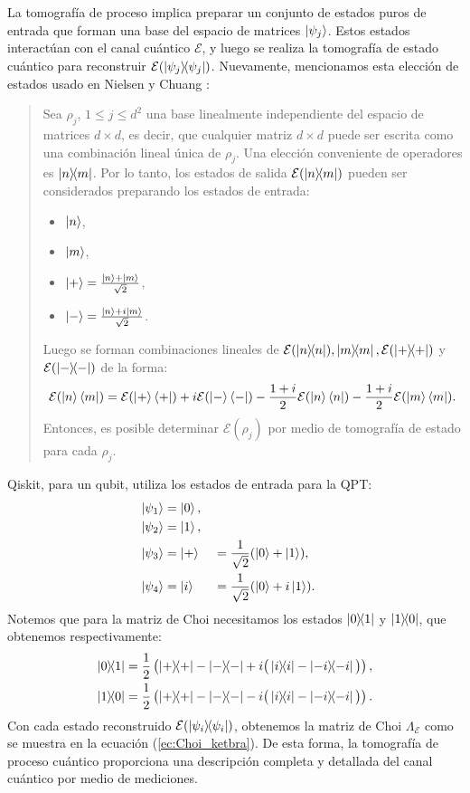 \documentclass[letterpaper,12pt]{thesisECFM}
\theoremstyle{plain}
\theoremstyle{definition}
\theoremstyle{definition}
\theoremstyle{remark}
\newcommand{\1}{\mathbb{1}}
\begin{document}
La tomografía de proceso implica preparar un conjunto de estados puros de entrada que forman una base del espacio de matrices $\ket{\psi_j}$. Estos estados interactúan con el canal cuántico $\mathcal{E}$, y luego se realiza la tomografía de estado cuántico para reconstruir $\mathcal{E}(\ketbra{\psi_j}{\psi_j})$. Nuevamente, mencionamos esta elección de estados usado en Nielsen y Chuang \cite{nielsen_chuang_2011}: 
\begin{quote}
Sea $\rho_j$, $1\leq j \leq d^2$ una base linealmente independiente del espacio de matrices $d\times d$, es decir, que cualquier matriz $d \times d$ puede ser escrita como una combinación lineal única de $\rho_j$.  Una elección conveniente de operadores es $\ketbra{n}{m}$. Por lo tanto, los estados de salida $\mathcal{E}(\ketbra{n}{m})$ pueden ser considerados preparando los estados de entrada:
\begin{itemize}
    \item$\ket{n}$,
    \item$\ket{m}$,
    \item$\ket{+} = \frac{\ket{n} + \ket{m}}{\sqrt{2}}$,
    \item$\ket{-} = \frac{\ket{n} + i\ket{m}}{\sqrt{2}}$.
\end{itemize}
Luego se forman combinaciones lineales de $\mathcal{E} (\ketbra{n}), \ketbra{m},\mathcal{E}(\ketbra{+})$ y $\mathcal{E}(\ketbra{-})$ de la forma:
\begin{equation}
    \mathcal{E}(\ket{n}\bra{m}) = \mathcal{E}(\ket{+}\bra{+}) + i \mathcal{E}(\ket{-}\bra{-}) - \frac{1 + i}{2} \mathcal{E}(\ket{n}\bra{n}) - \frac{1 + i}{2} \mathcal{E}(\ket{m}\bra{m}).
\end{equation}
Entonces, es posible determinar $\mathcal{E}(\rho_j)$ por medio de tomografía de estado para cada $\rho_j$.
\end{quote}

Qiskit, para un qubit, utiliza los estados de entrada para la QPT:
\begin{alignat}{2}
    \ket{\psi_1} &= \ket{0}, \\
    \ket{\psi_2} &= \ket{1}, \\
    \ket{\psi_3} &= \ket{+} &&= \frac{1}{\sqrt{2}}(\ket{0} + \ket{1}), \\
    \ket{\psi_4} &= \ket{i} &&= \frac{1}{\sqrt{2}}(\ket{0} + i\ket{1}).
\end{alignat}
Notemos que para la matriz de Choi necesitamos los estados $\ketbra{0}{1}$ y $\ketbra{1}{0}$, que obtenemos respectivamente:
\begin{alignat}{1}
    \ketbra{0}{1} &= \frac{1}{2} \left(\ketbra{+}{+} - \ketbra{-}{-} + i \big(\ketbra{i}{i} - \ketbra{-i}{-i} \big) \right), \\
    \ketbra{1}{0} &= \frac{1}{2} \left(\ketbra{+}{+} - \ketbra{-}{-} - i \big(\ketbra{i}{i} - \ketbra{-i}{-i} \big) \right).
\end{alignat}
Con cada estado reconstruido $\mathcal{E}(\ketbra{\psi_i})$,  obtenemos la matriz de Choi $\Lambda_{\mathcal{E}}$ como se muestra en la ecuación (\ref{ec:Choi_ketbra}). De esta forma, la tomografía de proceso cuántico proporciona una descripción completa y detallada del canal cuántico por medio de mediciones. 
\end{document}
